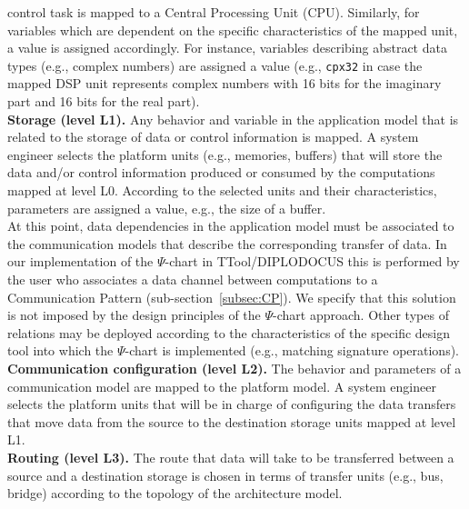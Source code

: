 \documentclass{llncs}
\begin{document}
control task is mapped to a Central Processing Unit (CPU). Similarly, for variables which are dependent on the specific
characteristics of the mapped unit, a value is assigned accordingly. For instance, variables describing abstract data
types (e.g., complex numbers) are assigned a value (e.g., \texttt{cpx32} in case the mapped DSP unit represents complex
numbers with 16 bits for the imaginary part and 16 bits for the real part).\\
%
\textbf{Storage (level L1).}
%
Any behavior and variable in the application model that is related to the storage of data or control information is
mapped. A system engineer selects the platform units (e.g., memories, buffers) that will store the data and/or
control information produced or consumed by the computations mapped at level L0. According to the selected units and
their characteristics, parameters are assigned a value, e.g., the size of a buffer.\\
%
At this point, data dependencies in the application model must be associated to the communication models that describe
the corresponding transfer of data. In our implementation of the $\Psi$-chart in TTool/DIPLODOCUS this is performed by
the user who associates a data channel between computations to a Communication Pattern (sub-section~\ref{subsec:CP}).
We specify that this solution is not imposed by the design principles of the $\Psi$-chart approach. Other types of
relations may be deployed according to the characteristics of the specific design tool into which the $\Psi$-chart
is implemented (e.g., matching signature operations).\\
%
\textbf{Communication configuration (level L2).}
%
The behavior and parameters of a communication model are mapped to the platform model. A system engineer selects the
platform units that will be in charge of configuring the data transfers that move data from the source to the
destination storage units mapped at level L1.\\
%
\textbf{Routing (level L3).}
%
The route that data will take to be transferred between a source and a destination storage is chosen in terms of
transfer units (e.g., bus, bridge) according to the topology of the architecture model.\\
%
\end{document}
